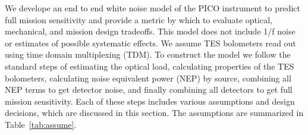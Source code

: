 \documentclass[]{spie}  %
\begin{document}
We develope an end to end white noise model of the PICO instrument to predict full mission sensitivity and 
provide a metric by which to evaluate optical, mechanical, and mission design tradeoffs.  This model does not include 
1/f noise or estimates of possible systematic effects.  We assume TES bolometers read out using time domain multiplexing (TDM). 
To construct the model we follow the standard steps\cite{suzuki2013_thesis,aubin2013_thesis} of estimating the 
optical load, calculating properties of the TES bolometers, calculating noise equivalent power (NEP) by source, 
combining all NEP terms to get detector noise, and finally combining all detectors to get full mission sensitivity.  
Each of these steps includes various assumptions and design decisions, 
which are discussed in this section.  The assumptions are summarized in Table~\ref{tab:assume}.
\end{document}
